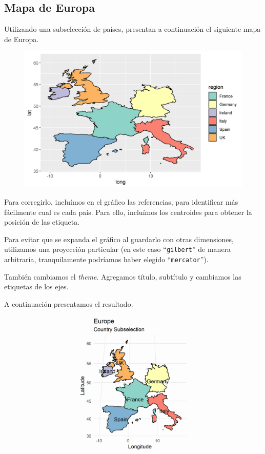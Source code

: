 \documentclass[9pt]{article}
\begin{document}
\subsection*{Mapa de Europa}
Utilizando una subselecci\'on de pa\'ises, presentan a continuaci\'on el siguiente mapa de Europa. 
\begin{figure}[H]
    \centering
    \includegraphics{original2.png}
\end{figure}
Para corregirlo, inclu\'imos en el gr\'afico las referencias, para identificar m\'as f\'acilmente cual es cada pa\'is. Para ello, inclu\'imos los centroides para obtener la posici\'on de las etiqueta. 

Para evitar que se expanda el gr\'afico al guardarlo con otras dimensiones, utilizamos una proyecci\'on particular (en este caso ``\texttt{gilbert}'' de manera arbitrar\'ia, tranquilamente podr\'iamos haber elegido ``\texttt{mercator}'').

Tambi\'en cambiamos el \textit{theme}. Agregamos t\'itulo, subt\'itulo y cambiamos las etiquetas de los ejes.

A continuaci\'on presentamos el resultado.
\begin{figure}[H]
    \centering
    \includegraphics{changed2.png}
\end{figure}
\end{document}
